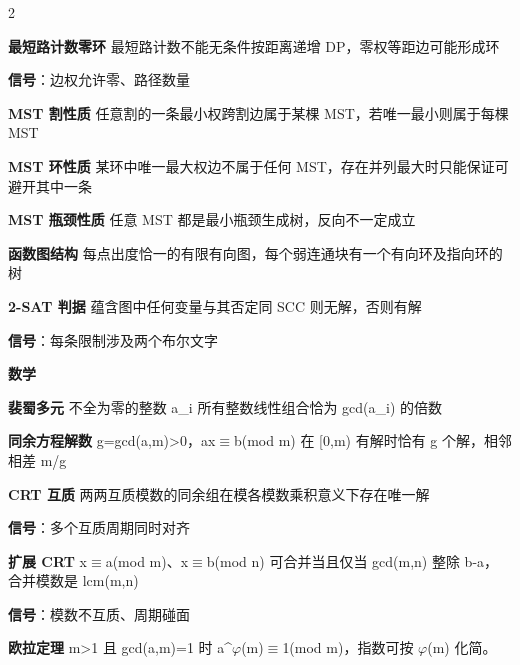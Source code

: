 \documentclass[UTF8,fontset=fandol,a4paper,twoside]{ctexart}
\newcommand{\topic}[1]{\par\smallskip\textbf{#1}\par\nobreak}
\begin{document}
\begin{multicols}{2}
\par\textbf{最短路计数零环}\quad
最短路计数不能无条件按距离递增 DP，零权等距边可能形成环\par
\textbf{信号}：边权允许零、路径数量\par
\par\textbf{MST 割性质}\quad
任意割的一条最小权跨割边属于某棵 MST，若唯一最小则属于每棵 MST\par
\par\textbf{MST 环性质}\quad
某环中唯一最大权边不属于任何 MST，存在并列最大时只能保证可避开其中一条\par
\par\textbf{MST 瓶颈性质}\quad
任意 MST 都是最小瓶颈生成树，反向不一定成立\par
\par\textbf{函数图结构}\quad
每点出度恰一的有限有向图，每个弱连通块有一个有向环及指向环的树\par
\par\textbf{2-SAT 判据}\quad
蕴含图中任何变量与其否定同 SCC 则无解，否则有解\par
\textbf{信号}：每条限制涉及两个布尔文字\par
\topic{数学}
\par\textbf{裴蜀多元}\quad
不全为零的整数 a\_i 所有整数线性组合恰为 gcd(\allowbreak{}a\_i)\allowbreak{} 的倍数\par
\par\textbf{同余方程解数}\quad
g=\allowbreak{}gcd(\allowbreak{}a,\allowbreak{}m)\allowbreak{}>\allowbreak{}0，ax\ensuremath{\equiv}b(\allowbreak{}mod m)\allowbreak{} 在 [\allowbreak{}0,\allowbreak{}m)\allowbreak{} 有解时恰有 g 个解，相邻相差 m/\allowbreak{}g\par
\par\textbf{CRT 互质}\quad
两两互质模数的同余组在模各模数乘积意义下存在唯一解\par
\textbf{信号}：多个互质周期同时对齐\par
\par\textbf{扩展 CRT}\quad
x\ensuremath{\equiv}a(\allowbreak{}mod m)\allowbreak{}、x\ensuremath{\equiv}b(\allowbreak{}mod n)\allowbreak{} 可合并当且仅当 gcd(\allowbreak{}m,\allowbreak{}n)\allowbreak{} 整除 b-\allowbreak{}a，合并模数是 lcm(\allowbreak{}m,\allowbreak{}n)\allowbreak{}\par
\textbf{信号}：模数不互质、周期碰面\par
\par\textbf{欧拉定理}\quad
m>\allowbreak{}1 且 gcd(\allowbreak{}a,\allowbreak{}m)\allowbreak{}=\allowbreak{}1 时 a\textasciicircum{}\ensuremath{\varphi}(\allowbreak{}m)\allowbreak{}\ensuremath{\equiv}1(\allowbreak{}mod m)\allowbreak{}，指数可按 \ensuremath{\varphi}(\allowbreak{}m)\allowbreak{} 化简。\par

\end{multicols}
\end{document}
